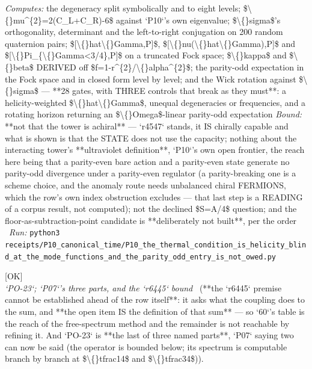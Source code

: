 \begin{description}
\emph{Computes:} the degeneracy split symbolically and to eight levels; \$\textbackslash\{\}mu\textasciicircum{}\{2\}=2(C\_L+C\_R)-6\$ against `P10`'s own eigenvalue; \$\textbackslash\{\}sigma\$'s orthogonality, determinant and the left-to-right conjugation on 200 random quaternion pairs; \$[\textbackslash\{\}hat\textbackslash\{\}Gamma,P]\$, \$[\textbackslash\{\}nu(\textbackslash\{\}hat\textbackslash\{\}Gamma),P]\$ and \$[\textbackslash\{\}Pi\_\{\textbackslash\{\}Gamma<3/4\},P]\$ on a truncated Fock space; \$\textbackslash\{\}kappa\$ and \$\textbackslash\{\}beta\$ DERIVED off \$f=1-r\textasciicircum{}\{2\}/\textbackslash\{\}alpha\textasciicircum{}\{2\}\$; the parity-odd expectation in the Fock space and in closed form level by level; and the Wick rotation against \$\textbackslash\{\}sigma\$ --- **28 gates, with THREE controls that break as they must**: a helicity-weighted \$\textbackslash\{\}hat\textbackslash\{\}Gamma\$, unequal degeneracies or frequencies, and a rotating horizon returning an \$\textbackslash\{\}Omega\$-linear parity-odd expectation
 \emph{Bound:}  **not that the tower is achiral** --- `r4547` stands, it IS chirally capable and what is shown is that the STATE does not use the capacity; nothing about the interacting tower's **ultraviolet definition**, `P10`'s own open frontier, the reach here being that a parity-even bare action and a parity-even state generate no parity-odd divergence under a parity-even regulator (a parity-breaking one is a scheme choice, and the anomaly route needs unbalanced chiral FERMIONS, which the row's own index obstruction excludes --- that last step is a READING of a corpus result, not computed); not the declined \$S=A/4\$ question; and the floor-as-subtraction-point candidate is **deliberately not built**, per the order
\ \emph{Run:} \texttt{python3 receipts/P10\_canonical\_time/P10\_the\_thermal\_condition\_is\_helicity\_blind\_at\_the\_mode\_functions\_and\_the\_parity\_odd\_entry\_is\_not\_owed.py}
\item[\rcptlabel{P10_the_remainder_is_the_last_of_three_and_is_not_reachable_by_refining_the_method}{P10R7}\textbf{P10R7}\quad\texttt{P10\_the\_remainder\_is\_the\_last\_of\_three\_and\_is\_not\_reachable\_by\_refining\_the\_method}]\hfill\textsf{[OK]}\\
\textit{`PO-23`; `P07`'s three parts, and the `r6445` bound} \ (**the `r6445` premise cannot be established ahead of the row itself**: it asks what the coupling does to the sum, and **the open item IS the definition of that sum** --- so `60`'s table is the reach of the free-spectrum method and the remainder is not reachable by refining it. And `PO-23` is **the last of three named parts**, `P07` saying two can now be said (the operator is bounded below; its spectrum is computable branch by branch at \$\textbackslash\{\}tfrac14\$ and \$\textbackslash\{\}tfrac34\$)). 

\end{description}
